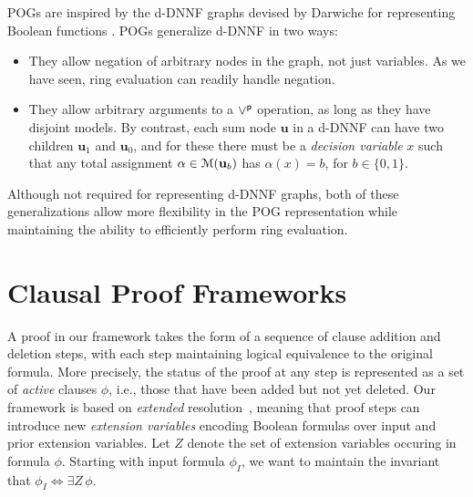 \documentclass[letterpaper,USenglish,cleveref, autoref, thm-restate]{lipics-v2021}
\newcommand{\por}{\mathbin{\lor^{\sf p}}}
\newcommand{\ifandonlyif}{\Leftrightarrow}
\newcommand{\assign}{\alpha}
\newcommand{\modelset}{{\cal M}}
\newcommand{\inputformula}{\phi_I}
\newcommand{\makenode}[1]{\mathbf{#1}}
\newcommand{\nodeu}{\makenode{u}}
\begin{document}
POGs are inspired by the d-DNNF graphs devised by Darwiche for
representing Boolean functions \cite{darwiche:jair:2002}.
POGs generalize d-DNNF in two ways:
\begin{itemize}
\item They allow negation of arbitrary nodes in the graph, not just
  variables.  As we have seen, ring evaluation can readily handle negation.

\item They allow arbitrary arguments to a $\por$ operation, as long as
  they have disjoint models.  By contrast, each
  sum node $\nodeu$ in a d-DNNF can have two children $\nodeu_1$ and $\nodeu_0$, and for these there must be a {\em decision variable} $x$ such that
  any total assignment $\assign \in  \modelset(\nodeu_b)$ has $\assign(x)=b$, for $b \in \{0,1\}$.
\end{itemize}
  Although not required for representing d-DNNF graphs,
  both of these generalizations allow more flexibility in the POG
  representation while maintaining the ability to efficiently perform ring evaluation.

\section{Clausal Proof Frameworks}

A proof in our framework takes the form of a sequence of clause addition
and deletion steps, with each step maintaining logical equivalence to
the original formula.  More precisely, the status of the proof at any step is represented as
a set of {\em active} clauses $\phi$, i.e., those that
have been added but not yet deleted.  Our framework is based
on {\em extended} resolution~\cite{Tseitin:1983}, meaning that proof
steps can introduce new {\em extension variables} encoding Boolean formulas over input and prior extension variables.
Let $Z$
denote the set of extension variables occuring in formula $\phi$.
Starting with input formula $\inputformula$,
we want to maintain the invariant that
$\inputformula \ifandonlyif \exists Z\,\phi$.
\end{document}
